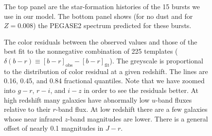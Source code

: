 \clearpage

\setcounter{thefigs}{0}

\clearpage
{}
\begin{figure}
\figurenum{\fignum}
\caption{\label{sfh} The top panel are the star-formation histories of
the 15 bursts we use in our model. The bottom panel shows (for no dust
and for $Z=0.008$) the PEGASE2 spectrum predicted for these bursts. }
\end{figure}

\clearpage
{}
\begin{figure}
\figurenum{\fignum}
\caption{\label{gmrz} }
\end{figure}

\clearpage
{}
\begin{figure}
\figurenum{\fignum}
\caption{\label{kfit} The color residuals between the observed values
  and those of the best fit to the nonnegative combination of 225
  templates ($\delta(b-r)\equiv [b-r]_{\mathrm{obs}} -
  [b-r]_{\mathrm{fit}}$). The greyscale is proportional to the
  distribution of color residual at a given redshift. The lines are
  0.16, 0.45, and 0.84 fractional quantiles. Note that we have zoomed
  into $g-r$, $r-i$, and $i-z$ in order to see the residuals
  better. At high redshift many galaxies have abnormally low $u$-band
  fluxes relative to their $r$-band flux. At low redshift there are a
  few galaxies whose near infrared $z$-band magnitudes are
  lower. There is a general offset of nearly 0.1 magnitudes in
  $J-r$. }
\end{figure}

